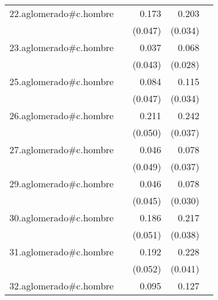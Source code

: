 {\begin{longtable}{l*{4}{D{.}{.}{-1}}}
\addlinespace
22.aglomerado#c.hombre&                     &       0.173\sym{***}&       0.203\sym{***}&                     \\
            &                     &     (0.047)         &     (0.034)         &                     \\
\addlinespace
23.aglomerado#c.hombre&                     &       0.037         &       0.068\sym{*}  &                     \\
            &                     &     (0.043)         &     (0.028)         &                     \\
\addlinespace
25.aglomerado#c.hombre&                     &       0.084         &       0.115\sym{***}&                     \\
            &                     &     (0.047)         &     (0.034)         &                     \\
\addlinespace
26.aglomerado#c.hombre&                     &       0.211\sym{***}&       0.242\sym{***}&                     \\
            &                     &     (0.050)         &     (0.037)         &                     \\
\addlinespace
27.aglomerado#c.hombre&                     &       0.046         &       0.078\sym{*}  &                     \\
            &                     &     (0.049)         &     (0.037)         &                     \\
\addlinespace
29.aglomerado#c.hombre&                     &       0.046         &       0.078\sym{*}  &                     \\
            &                     &     (0.045)         &     (0.030)         &                     \\
\addlinespace
30.aglomerado#c.hombre&                     &       0.186\sym{***}&       0.217\sym{***}&                     \\
            &                     &     (0.051)         &     (0.038)         &                     \\
\addlinespace
31.aglomerado#c.hombre&                     &       0.192\sym{***}&       0.228\sym{***}&                     \\
            &                     &     (0.052)         &     (0.041)         &                     \\
\addlinespace
32.aglomerado#c.hombre&                     &       0.095\sym{*}  &       0.127\sym{***}&                     \\

\end{longtable}}
